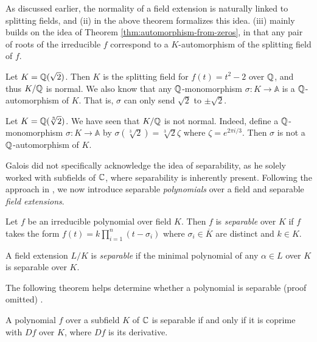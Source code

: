 As discussed earlier, the normality of a field extension is naturally linked to splitting fields, and (ii) in the above theorem formalizes this idea. (iii) mainly builds on the idea of Theorem \ref{thm:automorphism-from-zeros}, in that any pair of roots of the irreducible $f$ correspond to a $K$-automorphism of the splitting field of $f$. 

\begin{example}
	Let $K = \mathbb Q (\sqrt 2)$. Then $K$ is the splitting field for $f(t) = t^2 - 2$ over $\mathbb Q$, and thus $K/ \mathbb Q$ is normal. We also know that any $\mathbb Q$-monomorphism $\sigma: K \to \mathbb A$ is a $\mathbb Q$-automorphism of $K$. That is, $\sigma$ can only send $\sqrt 2$ to $\pm \sqrt 2$. 
\end{example}

\begin{example}
	Let $K = \mathbb Q(\sqrt[3]{2})$. We have seen that $K / \mathbb Q$ is not normal. Indeed, define a $\mathbb Q$-monomorphism $\sigma : K \to \mathbb A$ by $\sigma(\sqrt[3]{2}) =  \sqrt[3]{2}\zeta $ where $\zeta = e^{2 \pi i / 3}$. Then $\sigma$ is not a $\mathbb Q$-automorphism of $K$. 
\end{example}



Galois did not specifically acknowledge the idea of separability, as he solely worked with subfields of $\mathbb C$, where separability is inherently present. Following the approach in \cite[p.~128-129]{Stewart}, we now introduce separable \textit{polynomials} over a field and separable \textit{field extensions}.

\begin{definition}
    Let $f$ be an irreducible polynomial over field $K$. Then $f$ is \textit{separable} over $K$ if $f$ takes the form 
    $
        f(t) = k \prod_{i = 1} ^ n(t - \sigma_i)
    $
    where $\sigma_i \in \overline K$ are distinct and $k \in K$.
\end{definition}

\begin{definition}
	A field extension $L / K$ is \textit{separable} if the minimal polynomial of any $\alpha \in L$ over $K$ is separable over $K$.
\end{definition}

The following theorem helps determine whether a polynomial is separable (proof omitted) \cite[p.~128]{Stewart}. 

\begin{theorem} \label{thm:separable-derivative}
    A polynomial $f$ over a subfield $K$ of  $\mathbb C$ is separable if and only if it is coprime with $Df$ over $K$, where $Df$ is its derivative. 
\end{theorem}

